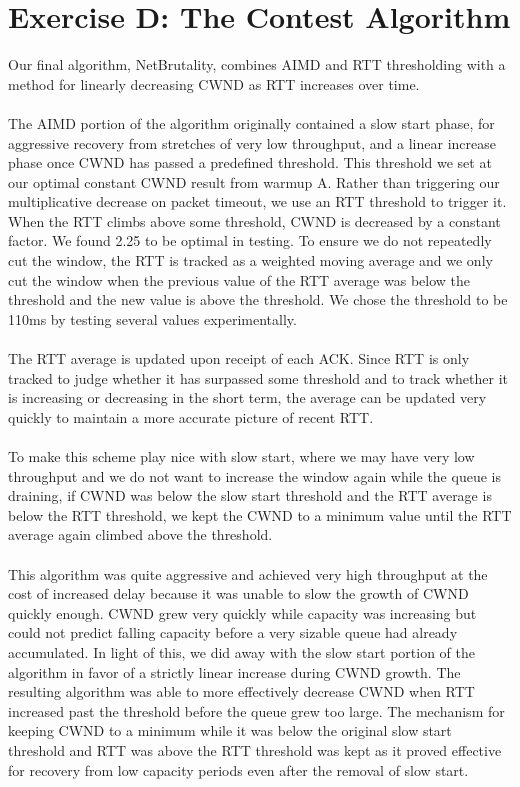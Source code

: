 \documentclass[12pt]{article}
\begin{document}
\section*{Exercise D: The Contest Algorithm}
Our final algorithm, NetBrutality, combines AIMD and RTT thresholding with a method for linearly decreasing CWND as RTT increases over time. \\ 
\\
The AIMD portion of the algorithm originally contained a slow start phase, for aggressive recovery from stretches of very low throughput, and a linear increase phase once CWND has passed a predefined threshold. This threshold we set at our optimal constant CWND result from warmup A. Rather than triggering our multiplicative decrease on packet timeout, we use an RTT threshold to trigger it. When the RTT climbs above some threshold, CWND is decreased by a constant factor. We found 2.25 to be optimal in testing. To ensure we do not repeatedly cut the window, the RTT is tracked as a weighted moving average and we only cut the window when the previous value of the RTT average was below the threshold and the new value is above the threshold. We chose the threshold to be 110ms by testing several values experimentally.\\
\\
The RTT average is updated upon receipt of each ACK. Since RTT is only tracked to judge whether it has surpassed some threshold and to track whether it is increasing or decreasing in the short term, the average can be updated very quickly to maintain a more accurate picture of recent RTT.\\
\\
To make this scheme play nice with slow start, where we may have very low throughput and we do not want to increase the window again while the queue is draining, if CWND was below the slow start threshold and the RTT average is below the RTT threshold, we kept the CWND to a minimum value until the RTT average again climbed above the threshold.\\
\\
This algorithm was quite aggressive and achieved very high throughput at the cost of increased delay because it was unable to slow the growth of CWND quickly enough. CWND grew very quickly while capacity was increasing but could not predict falling capacity before a very sizable queue had already accumulated. In light of this, we did away with the slow start portion of the algorithm in favor of a strictly linear increase during CWND growth. The resulting algorithm was able to more effectively decrease CWND when RTT increased past the threshold before the queue grew too large. The mechanism for keeping CWND to a minimum while it was below the original slow start threshold and RTT was above the RTT threshold was kept as it proved effective for recovery from low capacity periods even after the removal of slow start.\\
\end{document}
